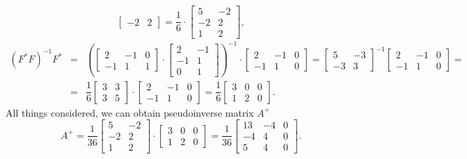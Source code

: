 \begin{solution}
\[\begin{bmatrix}
            -2 & 2
        \end{bmatrix} = \dfrac{1}{6}\cdot\begin{bmatrix}
            5 & -2 \\
            -2 & 2\\
            1 & 2
        \end{bmatrix},  
    \]
    \begin{eqnarray*}
        (F^* F)^{-1}  F^* &=& \left(\begin{bmatrix}
            2 & -1 & 0\\
            -1 & 1 & 1
        \end{bmatrix} \cdot \begin{bmatrix}
            2 & -1 \\ -1 & 1 \\
            0 & 1
        \end{bmatrix}\right)^{-1}\cdot \begin{bmatrix}
            2 & -1 & 0\\
            -1 & 1 & 0
        \end{bmatrix} = \begin{bmatrix}
            5 & -3 \\
            -3 & 3
        \end{bmatrix}^{-1} \begin{bmatrix}
            2 & -1 & 0\\
            -1 & 1 & 0
        \end{bmatrix} = \\ &=& \dfrac{1}{6} \begin{bmatrix}
            3 & 3 \\
            3 & 5
        \end{bmatrix} \cdot \begin{bmatrix}
            2 & -1 & 0\\
            -1 & 1 & 0
        \end{bmatrix} = \dfrac{1}{6} \begin{bmatrix}
            3 & 0 & 0\\
            1 & 2 & 0
        \end{bmatrix}.
    \end{eqnarray*}
    All things considered, we can obtain pseudoinverse matrix $A^+$
    \[
         
        A^+=\dfrac{1}{36} \begin{bmatrix}
            5 & -2 \\
            -2 & 2\\
            1 & 2
        \end{bmatrix} \cdot \begin{bmatrix}
            3 & 0 & 0\\
            1 & 2 & 0
        \end{bmatrix} = \dfrac{1}{36} \begin{bmatrix}
            13 & -4 & 0\\
            -4 & 4 & 0\\
            5 & 4 & 0
        \end{bmatrix}.
    \]
\end{solution}
